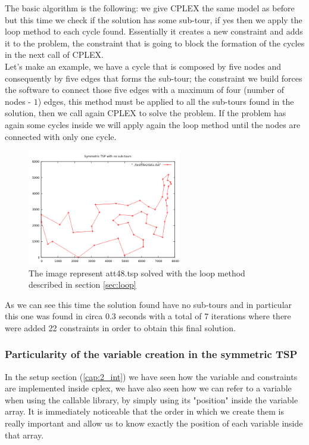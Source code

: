 The basic algorithm is the following: we give CPLEX the same model as before but this time we check if the solution has some sub-tour, if yes then we apply the loop method to each cycle found. Essentially it creates a new constraint and adds it to the problem, the constraint that is going to block the formation of the cycles in the next call of CPLEX. \\
Let's make an example, we have a cycle that is composed by five nodes and consequently by five edges that forms the sub-tour; the constraint we build forces the software to connect those five edges with a maximum of four (number of nodes - $1$) edges, this method must be applied to all the sub-tours found in the solution, then we call again CPLEX to solve the problem. If the problem has again some cycles inside we will apply again the loop method until the nodes are connected with only one cycle.

\begin{figure}[h]
	\centering
	\includegraphics[width=0.6\textwidth]{images/symmetric_with_no_tours}
	\caption{The image represent att48.tsp solved with the loop method described in section \ref{sec:loop}}
\end{figure}

As we can see this time the solution found have no sub-tours and in particular this one was found in circa $0.3$ seconds with a total of 7 iterations where there were added 22 constraints in order to obtain this final solution.

\subsubsection{Particularity of the variable creation in the symmetric TSP}
In the setup section (\ref{cap:2_int}) we have seen how the variable and constraints are implemented inside cplex, we have also seen how we can refer to a variable when using the callable library, by simply using its "position" inside the variable array. It is immediately noticeable that the order in which we create them is really important and allow us to know exactly the position of each variable inside that array.

